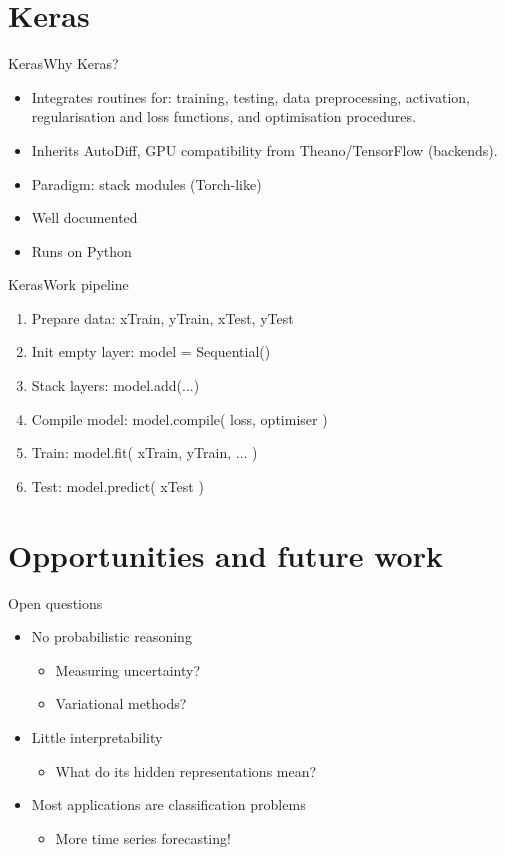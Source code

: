 \documentclass[handout]{beamer}
\theoremstyle{definition}
\theoremstyle{remark}
\begin{document}
\section{Keras}
\begin{frame}{Keras}{Why Keras?}
  \begin{itemize}
      \item Integrates routines for: training, testing, data preprocessing, activation, regularisation and loss functions, and optimisation procedures. \pause
      \item Inherits AutoDiff, GPU compatibility from Theano/TensorFlow (backends). \pause
      \item Paradigm: stack modules (Torch-like) \pause
      \item Well documented \pause 
      \item Runs on Python
  \end{itemize}
\end{frame}

\begin{frame}{Keras}{Work pipeline}
  \begin{enumerate}
      \item Prepare data: xTrain, yTrain, xTest, yTest \pause
      \item Init empty layer: model = Sequential() \pause
      \item Stack layers: model.add(...) \pause
      \item Compile model: model.compile( loss, optimiser )\pause
      \item Train: model.fit( xTrain, yTrain, ... ) \pause
      \item Test: model.predict( xTest ) 
  \end{enumerate}
\end{frame}

\section{Opportunities and future work}
\begin{frame}{Open questions}
  \begin{itemize}
      \item{ No probabilistic reasoning \pause
        \begin{itemize}
            \item Measuring uncertainty? \pause
            \item Variational methods? \pause
        \end{itemize}
      }
      \item{
        Little interpretability \pause
        \begin{itemize}
            \item What do its hidden representations mean? \pause
        \end{itemize}
      }
      \item{
        Most applications are classification problems
        \begin{itemize}
            \item More time series forecasting! 
        \end{itemize}
      }
  \end{itemize}
\end{frame}
\end{document}

